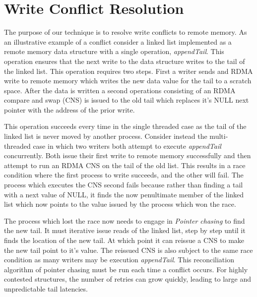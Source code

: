 \section{Write Conflict Resolution}


The purpose of our technique is to resolve write conflicts to remote
memory. As an illustrative example of a conflict consider a linked
list implemented as a remote memory data structure with a single
operation, \textit{appendTail}. This operation ensures that the next
write to the data structure writes to the tail of the linked list.
This operation requires two steps.  First a writer sends and RDMA
write to remote memory which writes the new data value for the tail to
a scratch space. After the data is written a second operations
consisting of an RDMA compare and swap (CNS) is issued to the old tail
which replaces it's NULL next pointer with the address of the prior
write.

This operation succeeds every time in the single threaded case as the
tail of the linked list is never moved by another process. Consider
instead the multi-threaded case in which two writers both attempt to
execute \textit{appendTail} concurrently. Both issue their first write
to remote memory successfully and then attempt to run an RDMA CNS on
the tail of the old list. This results in a race condition where the
first process to write succeeds, and the other will fail. The process
which executes the CNS second fails because rather than finding a tail
with a next value of NULL, it finds the now penultimate member of the
linked list which now points to the value issued by the process which
won the race. 

The process which lost the race now needs to engage in \textit{Pointer
chasing} to find the new tail. It must iterative issue reads of the
linked list, step by step until it finds the location of the new tail.
At which point it can reissue a CNS to make the new tail point to it's
value. The reissued CNS is also subject to the same race condition as
many writers may be execution \textit{appendTail}. This reconciliation
algorithm of pointer chasing must be run each time a conflict occurs.
For highly contested structures, the number of retries can grow
quickly, leading to large and unpredictable tail latencies.

